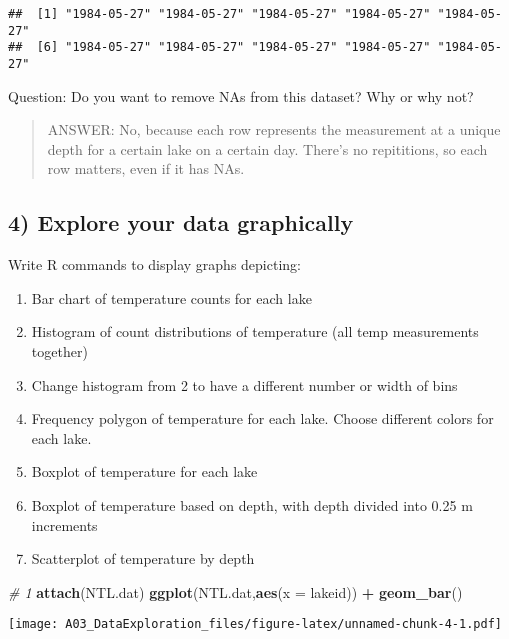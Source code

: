 \documentclass[]{article}
\newenvironment{Shaded}{\begin{snugshade}}{\end{snugshade}}
\newcommand{\KeywordTok}[1]{\textcolor[rgb]{0.13,0.29,0.53}{\textbf{#1}}}
\newcommand{\DataTypeTok}[1]{\textcolor[rgb]{0.13,0.29,0.53}{#1}}
\newcommand{\StringTok}[1]{\textcolor[rgb]{0.31,0.60,0.02}{#1}}
\newcommand{\CommentTok}[1]{\textcolor[rgb]{0.56,0.35,0.01}{\textit{#1}}}
\newcommand{\OperatorTok}[1]{\textcolor[rgb]{0.81,0.36,0.00}{\textbf{#1}}}
\newcommand{\NormalTok}[1]{#1}
\providecommand{\tightlist}{%
  \setlength{\itemsep}{0pt}\setlength{\parskip}{0pt}}
\begin{document}
\begin{verbatim}
##  [1] "1984-05-27" "1984-05-27" "1984-05-27" "1984-05-27" "1984-05-27"
##  [6] "1984-05-27" "1984-05-27" "1984-05-27" "1984-05-27" "1984-05-27"
\end{verbatim}

Question: Do you want to remove NAs from this dataset? Why or why not?

\begin{quote}
ANSWER: No, because each row represents the measurement at a unique
depth for a certain lake on a certain day. There's no repititions, so
each row matters, even if it has NAs.
\end{quote}

\subsection{4) Explore your data
graphically}\label{explore-your-data-graphically}

Write R commands to display graphs depicting:

\begin{enumerate}
\def\labelenumi{\arabic{enumi}.}
\tightlist
\item
  Bar chart of temperature counts for each lake
\item
  Histogram of count distributions of temperature (all temp measurements
  together)
\item
  Change histogram from 2 to have a different number or width of bins
\item
  Frequency polygon of temperature for each lake. Choose different
  colors for each lake.
\item
  Boxplot of temperature for each lake
\item
  Boxplot of temperature based on depth, with depth divided into 0.25 m
  increments
\item
  Scatterplot of temperature by depth
\end{enumerate}

\begin{Shaded}
\begin{Highlighting}[]
\CommentTok{# 1}
\KeywordTok{attach}\NormalTok{(NTL.dat)}
\KeywordTok{ggplot}\NormalTok{(NTL.dat,}\KeywordTok{aes}\NormalTok{(}\DataTypeTok{x =}\NormalTok{ lakeid)) }\OperatorTok{+}
\StringTok{  }\KeywordTok{geom_bar}\NormalTok{()}
\end{Highlighting}
\end{Shaded}

\texttt{[image: A03\_DataExploration\_files/figure-latex/unnamed-chunk-4-1.pdf]}
\end{document}
